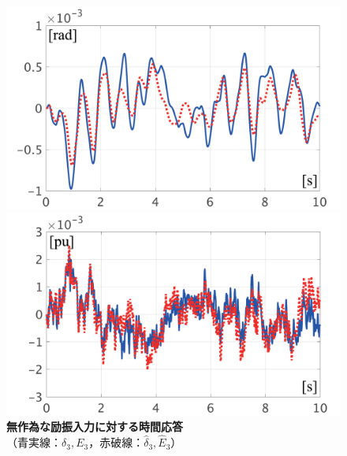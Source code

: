 \documentclass[tombow,dvipdfmx]{corona-a5-1.1}
\begin{document}
\begin{figure}[t]
  \centering
  {
  \begin{minipage}{0.49\linewidth}
    \centering
    \includegraphics[width = 1.0\linewidth]{figs/timedeltamodel}
     \medskip
  \end{minipage}
  \begin{minipage}{0.49\linewidth}
    \centering
    \includegraphics[width = 1.0\linewidth]{figs/timeEmodel}
     \medskip
  \end{minipage}
    }
\caption{\textbf{無作為な励振入力に対する時間応答}
 \\ \centering（青実線：$\delta_3,E_3$，赤破線：$\hat{\delta}_3,\hat{E}_3$）
 }
  \label{fig:timeVmodel}
\medskip
\end{figure}
\end{document}
